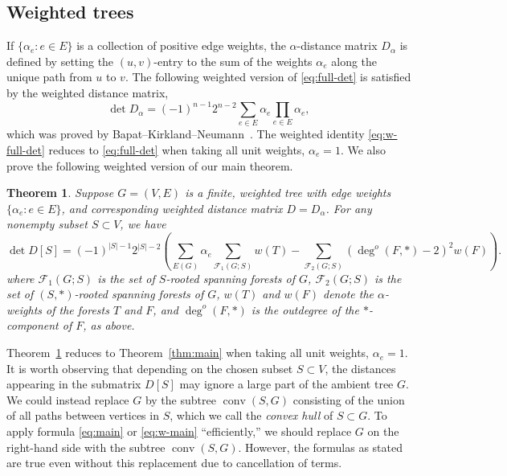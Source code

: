 \documentclass{amsart}
\newtheorem{thm}{Theorem}
\theoremstyle{definition}
\newcommand{\Da}{D_{\alpha}}
\DeclareMathOperator{\conv}{conv}
\newcommand{\trees}{\mathcal{F}_1}
\newcommand{\forests}{\mathcal{F}}
\newcommand{\degout}{\deg^o}
\begin{document}
\subsection{Weighted trees}
If $\{\alpha_e : e\in E\}$ is a collection of positive edge weights,  the $\alpha$-distance matrix $\Da$ 
is defined by setting the $(u,v)$-entry to the sum of the weights $\alpha_e$ along the unique path from $u$ to $v$.
The following weighted version of \eqref{eq:full-det}
is satisfied by the weighted distance matrix, 
\begin{equation}\label{eq:w-full-det}
	\det \Da = (-1)^{n-1} 2^{n-2} \sum_{e \in E} \alpha_e \prod_{e \in E} \alpha_e ,
\end{equation}
which was proved by Bapat--Kirkland--Neumann~\cite{bapat-kirkland-neumann}.
The weighted identity \eqref{eq:w-full-det} reduces to \eqref{eq:full-det} when taking all unit weights, $\alpha_e = 1$.
We also prove the following weighted version of our main theorem.
\begin{thm}
\label{thm:w-main}
Suppose $G = (V,E)$ is a finite, weighted tree with edge weights $\{\alpha_e : e \in E\}$, and corresponding weighted distance matrix $D = \Da$. For any nonempty subset $S \subset V$, we have
\begin{equation}\label{eq:w-main}
\det D[S] = (-1)^{|S|-1} 2^{|S|-2} \left( \sum_{E(G)}\alpha_e \sum_{\trees(G;S)} w(T) - \sum_{\forests_2(G;S)} (\degout(F,*) - 2)^2 w(F) \right).
\end{equation}
where 
$\trees(G;S)$ is the set of $S$-rooted spanning forests of $G$,
$\forests_2(G;S)$ is the set of $(S,*)$-rooted spanning forests of $G$,
$w(T)$ and $w(F)$ denote the $\alpha$-weights of the forests $T$ and $F$,
and 
$\degout(F, *)$ is the outdegree of the $*$-component of $F$, as above.
\end{thm}
Theorem~\ref{thm:w-main} reduces to Theorem~\ref{thm:main} when taking all unit weights, $\alpha_e = 1$.
It is worth observing that depending on the chosen subset $S \subset V$, the distances appearing in the submatrix $D[S]$ may ignore a large part of the ambient tree $G$.
We could instead replace $G$ by the subtree  $\conv(S,G)$ consisting of the union of all paths between vertices in $S$,
which we call the {\em convex hull} of $S \subset G$.
To apply formula \eqref{eq:main} or \eqref{eq:w-main} ``efficiently,''
we should replace $G$ on the right-hand side with the subtree $\conv(S,G)$.
However, the formulas as stated are true even without this replacement due to cancellation of terms.
\end{document}
